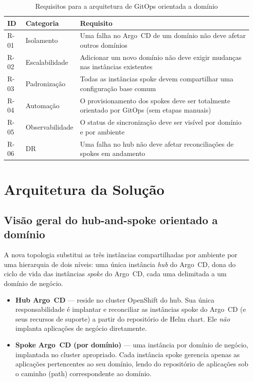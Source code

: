 \documentclass[11pt,a4paper]{article}
\begin{document}
\begin{table}[H]
  \centering
  \caption{Requisitos para a arquitetura de GitOps orientada a domínio}
  \label{tab:requirements}
  \small
  \begin{tabularx}{\linewidth}{@{} l l X @{}}
    \toprule
    \textbf{ID} & \textbf{Categoria} & \textbf{Requisito} \\
    \midrule
    R-01 & Isolamento     & Uma falha no Argo~CD de um domínio não deve afetar outros domínios \\
    R-02 & Escalabilidade & Adicionar um novo domínio não deve exigir mudanças nas instâncias existentes \\
    R-03 & Padronização   & Todas as instâncias spoke devem compartilhar uma configuração base comum \\
    R-04 & Automação      & O provisionamento dos spokes deve ser totalmente orientado por GitOps (sem etapas manuais) \\
    R-05 & Observabilidade& O status de sincronização deve ser visível por domínio e por ambiente \\
    R-06 & DR             & Uma falha no hub não deve afetar reconciliações de spokes em andamento \\
    \bottomrule
  \end{tabularx}
\end{table}

\section{Arquitetura da Solução}
\label{sec:architecture}

\subsection{Visão geral do hub-and-spoke orientado a domínio}

A nova topologia substitui as três instâncias compartilhadas por ambiente por uma
hierarquia de dois níveis: uma única instância \emph{hub} do Argo~CD, dona do ciclo de
vida das instâncias \emph{spoke} do Argo~CD, cada uma delimitada a um domínio de negócio.

\begin{itemize}[leftmargin=1.5em]
  \item \textbf{Hub Argo~CD} --- reside no cluster OpenShift do hub.
        Sua única responsabilidade é implantar e reconciliar as instâncias spoke do
        Argo~CD (e seus recursos de suporte) a partir do repositório de Helm chart.
        Ele \emph{não} implanta aplicações de negócio diretamente.

  \item \textbf{Spoke Argo~CD (por domínio)} --- uma instância por domínio de negócio,
        implantada no cluster apropriado.
        Cada instância spoke gerencia apenas as aplicações pertencentes ao seu domínio,
        lendo do repositório de aplicações sob o caminho (path) correspondente ao
        domínio.
\end{itemize}
\end{document}
